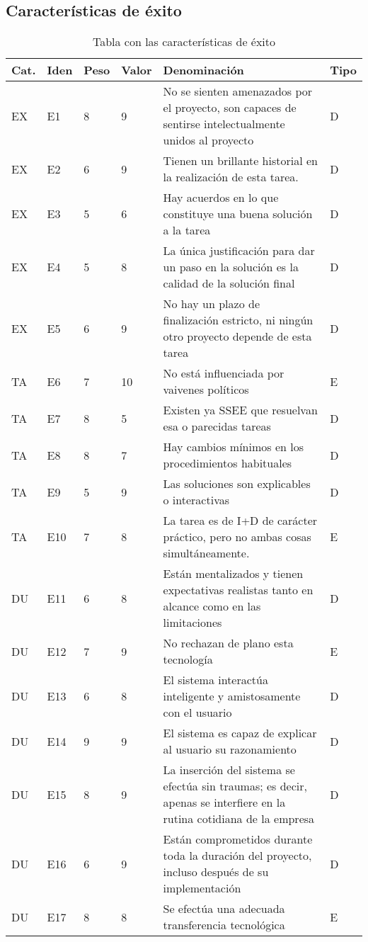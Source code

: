\subsection{Características de éxito}
\begin{table}[htb]%
  \centering
  \caption{Tabla con las características de éxito}
  \label{tab:anchura}
  \begin{tabular}{ | l | l | l | l | p{8cm} | l | }
    \hline
    Cat. & Iden & Peso & Valor & Denominación & Tipo \\ \hline
    EX & E1 & 8 & 9 & No se sienten amenazados por el proyecto, son capaces de sentirse intelectualmente unidos al proyecto & D \\ \hline
    EX & E2 & 6 & 9 & Tienen un brillante historial en la realización de esta tarea.  & D \\ \hline
    EX & E3 & 5 & 6 & Hay acuerdos en lo que constituye una buena solución a la tarea & D \\ \hline
    EX & E4 & 5 & 8 & La única justificación para dar un paso en la solución es la calidad de la solución final & D \\ \hline
    EX & E5 & 6 & 9 & No hay un plazo de finalización estricto, ni ningún otro proyecto depende de esta tarea & D \\ \hline
    TA & E6 & 7 & 10 & No está influenciada por vaivenes políticos & E \\ \hline
    TA & E7 & 8 & 5 & Existen ya SSEE que resuelvan esa o parecidas tareas & D \\ \hline
    TA & E8 & 8 & 7 & Hay cambios mínimos en los procedimientos habituales & D \\ \hline
    TA & E9 & 5 & 9 & Las soluciones son explicables o interactivas & D \\ \hline
    TA & E10 & 7 & 8 & La tarea es de I+D de carácter práctico, pero no ambas cosas simultáneamente.  & E \\ \hline
    DU & E11 & 6 & 8 & Están mentalizados y tienen expectativas realistas tanto en alcance como en las limitaciones & D \\ \hline
    DU & E12 & 7 & 9 & No rechazan de plano esta tecnología & E \\ \hline
    DU & E13 & 6 & 8 & El sistema interactúa inteligente y amistosamente con el usuario & D \\ \hline
    DU & E14 & 9 & 9 & El sistema es capaz de explicar al usuario su razonamiento & D \\ \hline
    DU & E15 & 8 & 9 & La inserción del sistema se efectúa sin traumas; es decir, apenas se interfiere en la rutina cotidiana de la empresa & D \\ \hline
    DU & E16 & 6 & 9 & Están comprometidos durante toda la duración del proyecto, incluso después de su implementación & D \\ \hline
    DU & E17 & 8 & 8 & Se efectúa una adecuada transferencia tecnológica & E \\ \hline
  \end{tabular}
\end{table}


